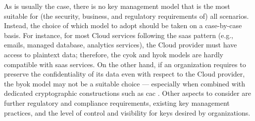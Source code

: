 As is usually the case, there is no key management model that is the most suitable for (the security, business, and regulatory requirements of) all scenarios. Instead, the choice of which model to adopt should be taken on a case-by-case basis. For instance, for most Cloud services following the \gls{saas} pattern (e.g., emails, managed database, analytics services), the Cloud provider must have access to plaintext data; therefore, the \gls{cyok} and \gls{hyok} models are hardly compatible with \gls{saas} services. On the other hand, if an organization requires to preserve the confidentiality of its data even with respect to the Cloud provider, the \gls{byok} model may not be a suitable choice --- especially when combined with dedicated cryptographic constructions such as \gls{cac} \cite{berlato_formal_2022,berlato_end_2022}. Other aspects to consider are further regulatory and compliance requirements, existing key management practices, and the level of control and visibility for keys desired by organizations.






































%
%



